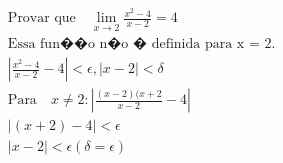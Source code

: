 \begin{ex}
\begin{align}
&\text{Provar que}\quad \lim_{x\rightarrow 2} \frac{x^2-4}{x-2}=4\nonumber\\ 
&\text{Essa fun��o n�o � definida para x = 2.}\nonumber\\
&\left|\frac{x^2-4}{x-2}-4\right| < \epsilon, \left|x-2\right| < \delta\nonumber\\
&\text{Para} \quad x\neq2 : \left|\frac{(x-2)(x+2}{x-2}-4\right|\nonumber\\
&\left|(x+2)-4\right| < \epsilon\nonumber\\
&\left|x-2\right| < \epsilon  (\delta = \epsilon)\nonumber
\end{align}
\end{ex}